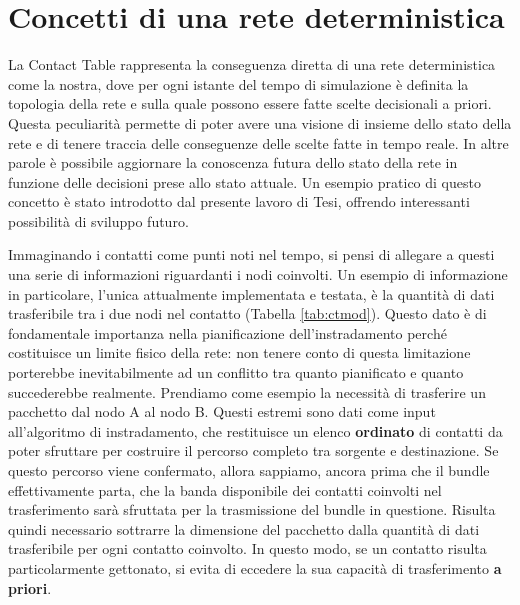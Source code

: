 \documentclass[12pt,a4paper,oneside]{book}
\begin{document}
		\section{Concetti di una rete deterministica} \label{concDet}

		La Contact Table rappresenta la conseguenza diretta di una rete deterministica come la nostra, dove per ogni istante del tempo di simulazione è definita la topologia della rete e sulla quale possono essere fatte scelte decisionali a priori. Questa peculiarità permette di poter avere una visione di insieme dello stato della rete e di tenere traccia delle conseguenze delle scelte fatte in tempo reale. In altre parole è possibile aggiornare la conoscenza futura dello stato della rete in funzione delle decisioni prese allo stato attuale. Un esempio pratico di questo concetto è stato introdotto dal presente lavoro di Tesi, offrendo interessanti possibilità di sviluppo futuro. 
		
		Immaginando i contatti come punti noti nel tempo, si pensi di allegare a questi una serie di informazioni riguardanti i nodi coinvolti. Un esempio di informazione in particolare, l'unica attualmente implementata e testata, è la quantità di dati trasferibile tra i due nodi nel contatto (Tabella \ref{tab:ctmod}). Questo dato è di fondamentale importanza nella pianificazione dell'instradamento perché costituisce un limite fisico della rete: non tenere conto di questa limitazione porterebbe inevitabilmente ad un conflitto tra quanto pianificato e quanto succederebbe realmente. 
		Prendiamo come esempio la necessità di trasferire un pacchetto dal nodo A al nodo B. Questi estremi sono dati come input all'algoritmo di instradamento, che restituisce un elenco \textbf{ordinato} di contatti da poter sfruttare per costruire il percorso completo tra sorgente e destinazione. Se questo percorso viene confermato, allora sappiamo, ancora prima che il bundle effettivamente parta, che la banda disponibile dei contatti coinvolti nel trasferimento sarà sfruttata per la trasmissione del bundle in questione. Risulta quindi necessario sottrarre la dimensione del pacchetto dalla quantità di dati trasferibile per ogni contatto coinvolto. In questo modo, se un contatto risulta particolarmente gettonato, si evita di eccedere la sua capacità di trasferimento {\bf a priori}.
		
\end{document}
